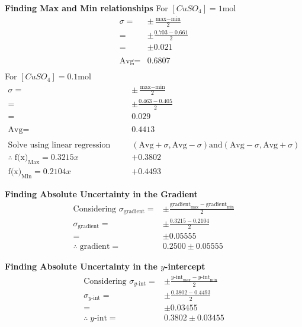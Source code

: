 \documentclass[10.5pt,a4paper]{article}
\begin{document}
\textbf{Finding Max and Min relationships}\newline
For $[CuSO_4]=1$mol\newline
\begin{align*}
	\sigma=&\pm\frac{\textrm{max}-\textrm{min}}{2}\\
	=&\pm\frac{0.703-0.661}{2}\\
	=&\pm0.021\\
	\\
	\textrm{Avg}=&0.6807\\
\end{align*}
For $[CuSO_4]=0.1$mol\newline
\begin{align*}
	\sigma=&\pm\frac{\textrm{max}-\textrm{min}}{2}\\
	=&\pm\frac{0.463-0.405}{2}\\
	=&0.029\\
	\\
	\textrm{Avg}=&0.4413\\
	&\\
	\textrm{Solve using linear regression between} &(\textrm{Avg}+\sigma, \textrm{Avg}-\sigma) \textrm{and}(\textrm{Avg}-\sigma, \textrm{Avg}+\sigma) \\
	\therefore \; \textrm{f(x)}_\textrm{Max}=0.3215 x& + 0.3802\\
	\textrm{f(x)}_\textrm{Min}=0.2104 x& + 0.4493
\end{align*}

\textbf{Finding Absolute Uncertainty in the Gradient}\newline
\begin{align*}
	\textrm{Considering }\sigma_\textrm{gradient}=&\pm\frac{\textrm{gradient}_\textrm{max}-\textrm{gradient}_\textrm{min}}{2}\\
	\sigma_\textrm{gradient}=&\pm\frac{0.3215-0.2104}{2}\\
	=&\pm0.05555\\
	\therefore\;\textrm{gradient}=\ \;&0.2500\pm0.05555
\end{align*}

\textbf{Finding Absolute Uncertainty in the $y$-intercept}\newline
\begin{align*}
	\textrm{Considering }\sigma_\textrm{$y$-int}=&\pm\frac{\textrm{$y$-int}_\textrm{max}-\textrm{$y$-int}_\textrm{min}}{2}\\
	\sigma_\textrm{$y$-int}=&\pm\frac{0.3802-0.4493}{2}\\
	=&\pm0.03455\\
	\therefore\;\textrm{$y$-int}=\;&0.3802\pm0.03455
\end{align*}
\end{document}

